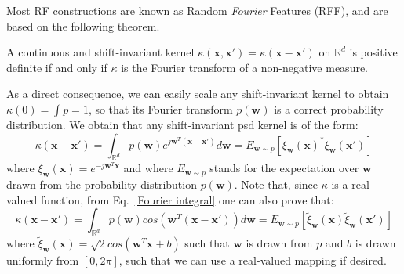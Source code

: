 Most RF constructions are known as Random \emph{Fourier} Features (RFF), and are based on the following theorem.
\begin{theorem}
	A continuous and shift-invariant kernel $\kappa(\mathbf{x},\mathbf{x}')=\kappa(\mathbf{x}-\mathbf{x}')$ on $\mathbb{R}^d$ is positive definite if and only if $\kappa$ is the Fourier transform of a non-negative measure.
\end{theorem}
As a direct consequence, we can easily scale any shift-invariant kernel to obtain $\kappa(0) = \int p = 1$, so that its Fourier transform $p(\mathbf{w})$ is a correct probability distribution. We obtain that any shift-invariant psd kernel is of the form:
\begin{equation}
\label{Fourier integral}
\kappa(\mathbf{x}-\mathbf{x}')=\int_{\mathbb{R}^d}p(\mathbf{w})e^{j\mathbf{w}^T(\mathbf{x}-\mathbf{x}')}d\mathbf{w}= E_{\mathbf{w}\sim p}[\xi_\mathbf{w}(\mathbf{x})^*\xi_\mathbf{w}(\mathbf{x}')]
\end{equation}
where $\xi_\mathbf{w}(\mathbf{x})=e^{-j\mathbf{w}^T\mathbf{x}}$ and where $E_{\mathbf{w}\sim p}$ stands for the expectation over $\mathbf{w}$ drawn from the probability distribution $p(\mathbf{w})$. Note that, since $\kappa$ is a real-valued function, from Eq.~\ref{Fourier integral} one can also prove that:
\begin{equation}
\label{real Fourier integral}
\kappa(\mathbf{x}-\mathbf{x}')=\int_{\mathbb{R}^d}p(\mathbf{w})cos({\mathbf{w}^T(\mathbf{x}-\mathbf{x}')})d\mathbf{w}=E_{\mathbf{w}\sim p}[\tilde \xi_\mathbf{w}(\mathbf{x})\tilde \xi_\mathbf{w}(\mathbf{x}')]
\end{equation}
where $\tilde \xi_\mathbf{w}(\mathbf{x})=\sqrt{2}cos(\mathbf{w}^T\mathbf{x}+b)$ such that $\mathbf{w}$ is drawn from $p$ and $b$ is drawn uniformly from $[0,2\pi]$, such that we can use a real-valued mapping if desired.

